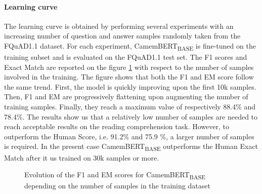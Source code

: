 \documentclass{article}
\begin{document}
\paragraph{Learning curve}
The learning curve is obtained by performing several experiments with an increasing number of question and answer samples randomly taken from the FQuAD1.1 dataset.
For each experiment, CamemBERT\textsubscript{BASE} is fine-tuned on the training subset and is evaluated on the FQuAD1.1 test set.
The F1 scores and Exact Match are reported on the figure \ref{fig:learningcurve} with respect to the number of samples involved in the training.
The figure shows that both the F1 and EM score follow the same trend.
First, the model is quickly improving upon the first 10k samples.
Then, F1 and EM are progressively flattening upon augmenting the number of training samples.
Finally, they reach a maximum value of respectively 88.4\% and 78.4\%.
The results show us that a relatively low number of samples are needed to reach acceptable results on the reading comprehension task. 
However, to outperform the Human Score, i.e. 91.2\% and 75.9 \%, a larger number of samples is required.
In the present case CamemBERT\textsubscript{BASE} outperforms the Human Exact Match after it us trained on 30k samples or more.


\begin{figure}[ht!]
    \centering
    \caption{Evolution of the F1 and EM scores for CamemBERT\textsubscript{BASE} depending on the number of samples in the training dataset}
    \label{fig:learningcurve}
\end{figure}
 
\end{document}

